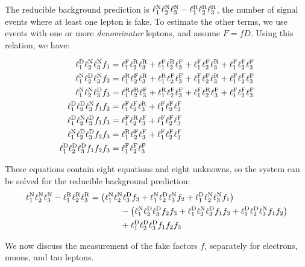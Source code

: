 The reducible background prediction is $\NNN-\RRR$, the number of signal events where at least one lepton is fake. To estimate the other terms, we use events with one or more \emph{denominator} leptons, and assume $F=fD$. Using this relation, we have:

\begin{align}
	\DNN f_{1} &= \FRR + \FRF + \FFR + \FFF \\
	\NDN f_{2} &= \RFR + \RFF + \FFR + \FFF \\
	\NND f_{3} &= \RRF + \RFF + \FRF + \FFF \\
	\DDN f_{1}f_{2} &= \FFR + \FFF \\
	\DND f_{1}f_{3} &= \FRF + \FFF \\
	\NDD f_{2}f_{3} &= \RFF + \FFF \\
	\DDD f_{1}f_{2}f_{3} &= \FFF
\end{align}

These equations contain eight equations and eight unknowns, so the system can be solved for the reducible background prediction:
\begin{align} \label{eq:fake-factor-master-formula}
	\NNN - \RRR &= \left( \NND f_{3} + \NDN f_{2}  + \DNN f_{1}\right)  \\
		 & \hspace{0.5in} - \left( \NDD f_{2}f_{3} + \DND f_{1}f_{3} + \DDN f_{1}f_{2}\right) \\
		 & \hspace{0.5in} + \DDD f_{1}f_{2}f_{3}
\end{align}

We now discuss the measurement of the fake factors $f$, separately for electrons, muons, and tau leptons.

